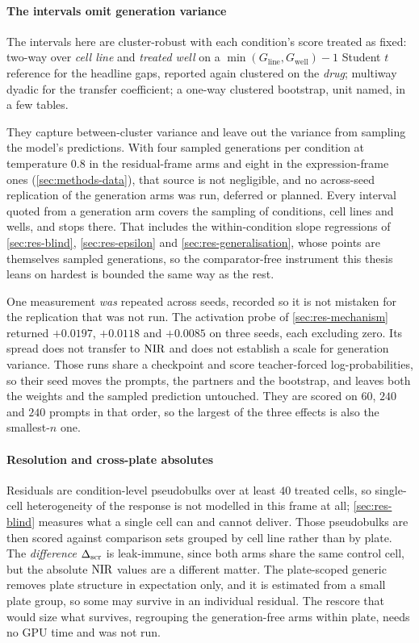 \paragraph{The intervals omit generation variance} The intervals here are
cluster-robust with each condition's score treated as fixed: two-way over
\emph{cell line} and \emph{treated well} on a $\min(G_{\textrm{line}},
G_{\textrm{well}}) - 1$ Student $t$ reference for the headline gaps, reported
again clustered on the \emph{drug}; multiway dyadic for the transfer
coefficient; a one-way clustered bootstrap, unit named, in a few tables.

They capture between-cluster variance and leave out the variance from sampling
the model's predictions. With four sampled generations per condition at temperature
$0.8$ in the residual-frame arms and eight in the expression-frame ones
(\cref{sec:methods-data}), that source is not negligible, and no across-seed
replication of the generation arms was run, deferred or planned. Every interval
quoted from a generation arm covers the sampling of conditions, cell lines and
wells, and stops there. That includes the within-condition slope regressions of
\cref{sec:res-blind}, \cref{sec:res-epsilon} and \cref{sec:res-generalisation},
whose points are themselves sampled generations, so the comparator-free
instrument this thesis leans on hardest is bounded the same way as the rest.

One measurement \emph{was} repeated across seeds, recorded so it is not mistaken
for the replication that was not run. The activation probe of
\cref{sec:res-mechanism} returned $+0.0197$, $+0.0118$ and $+0.0085$ on three
seeds, each excluding zero. Its spread does not transfer to $\textrm{NIR}$ and does not
establish a scale for generation variance. Those runs share a checkpoint and
score teacher-forced log-probabilities, so their seed moves the prompts, the
partners and the bootstrap, and leaves both the weights and the sampled
prediction untouched. They are scored on $60$, $240$ and $240$ prompts in that order, so
the largest of the three effects is also the smallest-$n$ one.

\paragraph{Resolution and cross-plate absolutes} Residuals are condition-level
pseudobulks over at least $40$ treated cells, so single-cell heterogeneity of the
response is not modelled in this frame at all; \cref{sec:res-blind} measures what
a single cell can and cannot deliver. Those pseudobulks are then scored against
comparison sets grouped by cell line rather than by plate. The \emph{difference}
$\Delta_{\textrm{scr}}$ is leak-immune, since both arms share the same control cell, but the
absolute $\textrm{NIR}$ values are a different matter. The plate-scoped generic removes
plate structure in expectation only, and it is estimated from a small plate
group, so some may survive in an individual residual. The rescore that would size
what survives, regrouping the generation-free arms within plate, needs no GPU
time and was not run.

